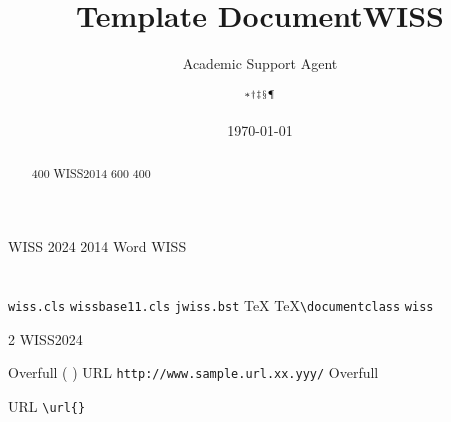 \documentclass{article}
\title{Template Document}
\author{Academic Support Agent}
\date{\today}
\begin{document}
\maketitle

%  
\title{WISS \textcolor{red}{ }}
\etitle{}%
%
% 
%
%
\author{   \affil{ $\times$ } \affil{ }   \affil{ }
   \affil{ }   \affil{ }
   \affil{ }   ${}^* {}^\dag {}^\ddag {}^\mathsection
{}^\mathparagraph$}

\begin{abstract}
 400 WISS2014 600 400 
           
           
           
           
           
           
           
           
       
\end{abstract}

\maketitle

\section{ }

 \LaTeXe{} WISS 2024  
 2014 Word 
 WISS  \cite{wiss}
 
 
 
 

\section{ }

\subsection{ }

 \verb|wiss.cls| 
\verb|wissbase11.cls| \verb|jwiss.bst| 
 \TeX  
 \TeX  \verb|\documentclass| \verb|wiss| 
 

 
 2 
 WISS2024 

Overfull ( ) 
 URL 
\verb|http://www.sample.url.xx.yyy/|  Overfull 
 
URL \verb|\url{}| 
 
\end{document}
